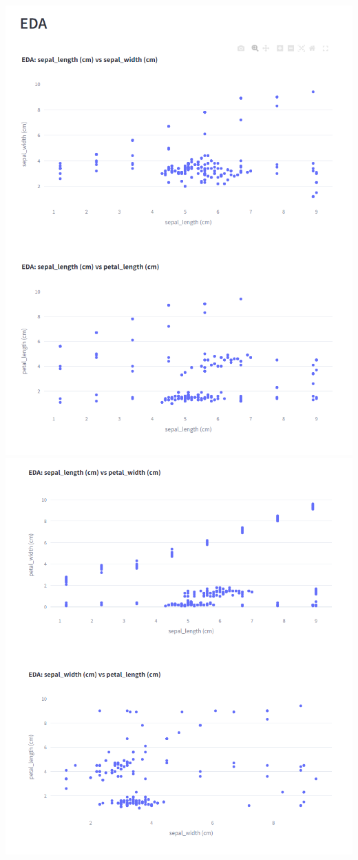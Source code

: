 \documentclass{article}
\begin{document}
\includegraphics[width=1.0\linewidth]{tab0_eda1-2.png}
\includegraphics[width=1.0\linewidth]{tab0_eda3-4.png}
\end{document}
